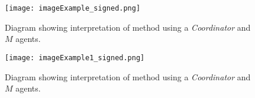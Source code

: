 \documentclass{article}
\begin{document}
\begin{figure}[t]
  \centering
  \texttt{[image: imageExample\_signed.png]}
  \caption{Diagram showing interpretation of method using a \emph{Coordinator}
    and $M$ agents.}\label{fig:schemeQuantity}
\end{figure}
\begin{figure}[t]
  \centering
  \texttt{[image: imageExample1\_signed.png]}
  \caption{Diagram showing interpretation of method using a \emph{Coordinator}
    and $M$ agents.}\label{fig:schemeQuantity}
\end{figure}
\end{document}

